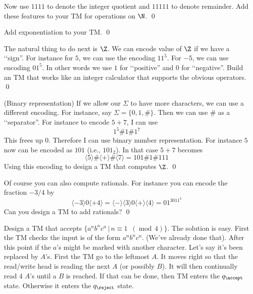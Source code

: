 \begin{ex}
Now use $1111$ to denote the integer quotient
and $11111$ to denote remainder.
Add these features to your TM for operations on $\N$.
\qed
\end{ex}

\begin{ex}
Add exponentiation to your TM.
\qed
\end{ex}
  

\begin{ex}
The natural thing to do next is $\Z$.
We can encode value of $\Z$ if we have a \lq\lq sign''.
For instance for $5$, we can use the encoding $11^5$.
For $-5$, we can use encoding $01^5$.
In other words we use $1$ for \lq\lq positive'' and $0$ for \lq\lq negative''.
Build an TM that works like an integer calculator that
supports the obvious operators.
\qed
\end{ex}

\begin{ex} (Binary representation)
If we allow our $\Sigma$ to have more characters, we can
use a different encoding.
For instance, say $\Sigma = \{0,1,\#\}$.
Then we can use $\#$ as a \lq\lq separator''.
For instance to encode $5+7$, I can use
\[
1^5 \# 1 \# 1^7
\]
This frees up $0$.
Therefore I can use binary number representation.
For instance $5$ now can be encoded as $101$ (i.e., $101_2$).
In that case $5 + 7$ becomes
\[
\langle 5 \rangle \# \langle + \rangle \# \langle 7 \rangle
= 101 \# 1 \# 111
\]
Using this encoding to design a TM that computes $\Z$.
\qed
\end{ex}

\begin{ex}
Of course you can also compute rationals. For instance you
 can encode the fraction $-3/4$ by
 \[
 \langle -3 \rangle 0 \langle +4 \rangle
 = \langle - \rangle \langle 3 \rangle 0 \langle + \rangle \langle 4 \rangle
 = 01^3011^4
 \]
 Can you design a TM to add rationals?
 \qed
\end{ex}

\begin{eg}
Design a TM that accepts $\{a^nb^nc^n \,|\, n \equiv 1
\,\,\,(\operatorname{mod} \, 4)\}$. The solution is easy. First
the TM checks the input is of the form $a^nb^nc^n$. (We've already
done that). After this point if the $a$'s might be marked with
another character. Let's say it's been replaced by $A$'s. First
the TM go to the leftmost $A$. It moves right so that the
read/write head is reading the next $A$ (or possibly $B$). It will
then continually read 4 $A$'s until a $B$ is reached. If that can
be done, then TM enters the $q_{\accept}$ state. Otherwise it
enters the $q_{\reject}$ state.
\end{eg}


